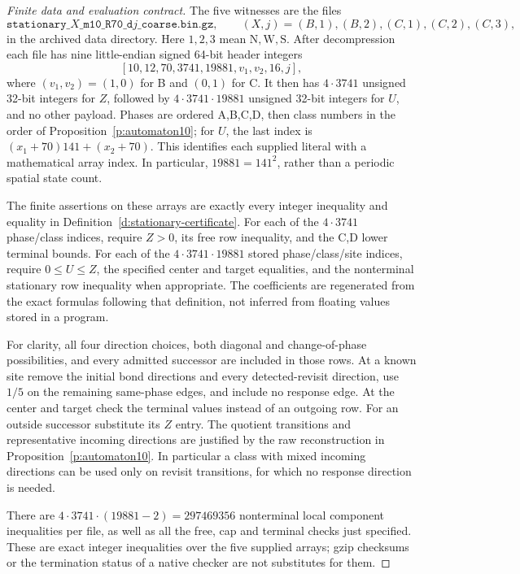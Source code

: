 \begin{proof}[Finite data and evaluation contract]
The five witnesses are the files
\[
 \texttt{stationary\_}\!X\texttt{\_m10\_R70\_d}j
                  \texttt{\_coarse.bin.gz},
 \qquad (X,j)=(B,1),(B,2),(C,1),(C,2),(C,3),
\]
in the archived data directory. Here \(1,2,3\) mean
\(\mathrm N,\mathrm W,\mathrm S\). After decompression each file
has nine little-endian signed 64-bit header integers
\[
 [10,12,70,3741,19881,v_1,v_2,16,j],
\]
where \((v_1,v_2)=(1,0)\) for B and \((0,1)\) for C.
It then has \(4\cdot3741\) unsigned 32-bit integers for \(Z\),
followed by \(4\cdot3741\cdot19881\) unsigned 32-bit integers
for \(U\), and no other payload. Phases are ordered A,B,C,D,
then class numbers in the order of
Proposition~\ref{p:automaton10}; for \(U\), the last index is
\((x_1+70)141+(x_2+70)\). This identifies each supplied literal
with a mathematical array index. In particular,
\(19881=141^2\), rather than a periodic spatial state count.

The finite assertions on these arrays are exactly every integer
inequality and equality in Definition~\ref{d:stationary-certificate}.
For each of the \(4\cdot3741\) phase/class indices, require
\(Z>0\), its free row inequality, and the C,D lower terminal
bounds. For each of the \(4\cdot3741\cdot19881\) stored
phase/class/site indices, require \(0\le U\le Z\), the specified
center and target equalities, and the nonterminal stationary row
inequality when appropriate. The coefficients are regenerated
from the exact formulas following that definition, not inferred
from floating values stored in a program.

For clarity, all four direction choices, both diagonal and
change-of-phase possibilities, and every admitted successor are
included in those rows. At a known site remove the initial bond
directions and every detected-revisit direction, use \(1/5\) on
the remaining same-phase edges, and include no response edge.
At the center and target check the terminal values instead of an
outgoing row. For an outside successor substitute its \(Z\) entry.
The quotient transitions and representative incoming directions
are justified by the raw reconstruction in
Proposition~\ref{p:automaton10}. In particular a class with mixed
incoming directions can be used only on revisit transitions, for
which no response direction is needed.

There are \(4\cdot3741\cdot(19881-2)=297469356\) nonterminal
local component inequalities per file, as well as all the free,
cap and terminal checks just specified. These are exact integer
inequalities over the five supplied arrays; gzip checksums or the
termination status of a native checker are not substitutes for them.


\end{proof}
